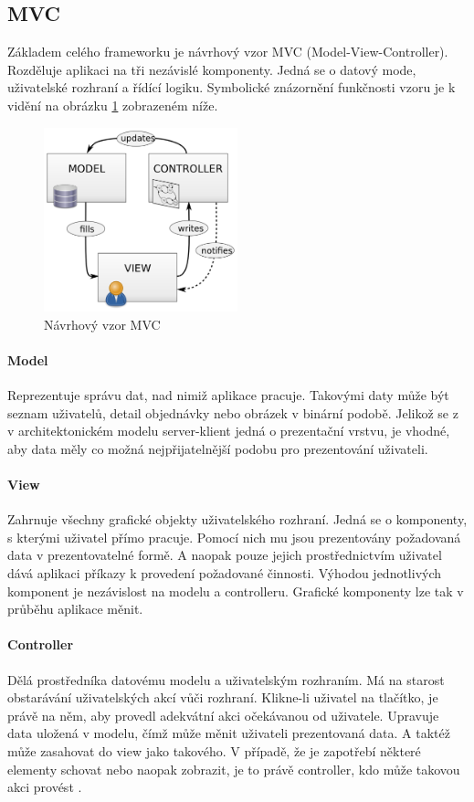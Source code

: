 \documentclass[thesis=M,czech]{FITthesis}[2012/06/26]
\begin{document}
\subsection{MVC}
\label{ssec:mvc}
Základem celého frameworku je návrhový vzor MVC (Model-View-Controller). Rozděluje aplikaci na tři nezávislé komponenty. Jedná se o datový mode, uživatelské rozhraní a řídící logiku. Symbolické znázornění funkčnosti vzoru je k vidění na obrázku \ref{img:mvc} zobrazeném níže.
\begin{figure}[H]
	\centering
	\includegraphics[width=0.5\textwidth]{images/mvc.png}
	\caption{Návrhový vzor MVC \cite{mvc}}
	\label{img:mvc}
\end{figure}
\paragraph{Model} Reprezentuje správu dat, nad nimiž aplikace pracuje. Takovými daty může být seznam uživatelů, detail objednávky nebo obrázek v binární podobě. Jelikož se z v architektonickém modelu server-klient jedná o prezentační vrstvu, je vhodné, aby data měly co možná nejpřijatelnější podobu pro prezentování uživateli. 
\paragraph{View} Zahrnuje všechny grafické objekty uživatelského rozhraní. Jedná se o komponenty, s kterými uživatel přímo pracuje. Pomocí nich mu jsou prezentovány požadovaná data v prezentovatelné formě. A naopak pouze jejich prostřednictvím uživatel dává aplikaci příkazy k provedení požadované činnosti. Výhodou jednotlivých komponent je nezávislost na modelu a controlleru. Grafické komponenty lze tak v průběhu aplikace měnit. 
\paragraph{Controller} Dělá prostředníka datovému modelu a uživatelským rozhraním. Má na starost obstarávání uživatelských akcí vůči rozhraní. Klikne-li uživatel na tlačítko, je právě na něm, aby provedl adekvátní akci očekávanou od uživatele. Upravuje data uložená v modelu, čímž může měnit uživateli prezentovaná data. A taktéž může zasahovat do view jako takového. V případě, že je zapotřebí některé elementy schovat nebo naopak zobrazit, je to právě controller, kdo může takovou akci provést \cite{mvc}.
\end{document}
